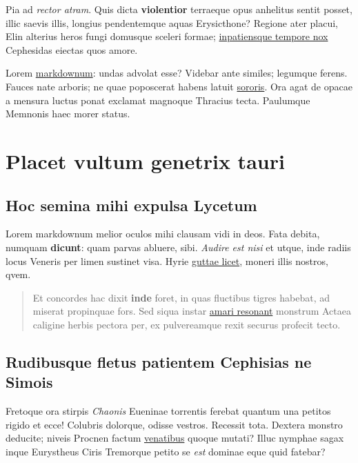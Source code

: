 \documentclass[%
    ]{scrartcl}
\begin{document}
Pia ad \emph{rector atram}. Quis dicta \textbf{violentior} terraeque
opus anhelitus sentit posset, illic saevis illis, longius pendentemque
aquas Erysicthone? Regione ater placui, Elin alterius heros fungi
domusque sceleri formae; \href{http://gradive.com/ter.aspx}{inpatiensque
tempore nox} Cephesidas eiectas quos amore.

Lorem \href{http://conscialumen.com/venit}{markdownum}: undas advolat
esse? Videbar ante similes; legumque ferens. Fauces nate arboris; ne
quae poposcerat habens latuit \href{http://petere.com/esse}{sororis}.
Ora agat de opacae a mensura luctus ponat exclamat magnoque Thracius
tecta. Paulumque Memnonis haec morer status.

\hypertarget{placet-vultum-genetrix-tauri}{%
\section{Placet vultum genetrix
tauri}\label{placet-vultum-genetrix-tauri}}

\hypertarget{hoc-semina-mihi-expulsa-lycetum}{%
\subsection{Hoc semina mihi expulsa
Lycetum}\label{hoc-semina-mihi-expulsa-lycetum}}

Lorem markdownum melior oculos mihi clausam vidi in deos. Fata debita,
numquam \textbf{dicunt}: quam parvas abluere, sibi. \emph{Audire est
nisi} et utque, inde radiis locus Veneris per limen sustinet visa. Hyrie
\href{http://phoebe-ille.com/sisterehoc}{guttae licet}, moneri illis
nostros, qvem.

\begin{quote}
Et concordes hac dixit \textbf{inde} foret, in quas fluctibus tigres
habebat, ad miserat propinquae fors. Sed siqua instar
\href{http://crurumquegaleam.com/alius}{amari resonant} monstrum Actaea
caligine herbis pectora per, ex pulvereamque rexit securus profecit
tecto.
\end{quote}

\hypertarget{rudibusque-fletus-patientem-cephisias-ne-simois}{%
\subsection{Rudibusque fletus patientem Cephisias ne
Simois}\label{rudibusque-fletus-patientem-cephisias-ne-simois}}

Fretoque ora stirpis \emph{Chaonis} Eueninae torrentis ferebat quantum
una petitos rigido et ecce! Colubris dolorque, odisse vestros. Recessit
tota. Dextera monstro deducite; niveis Procnen factum
\href{http://www.sedem.io/}{venatibus} quoque mutati? Illuc nymphae
sagax inque Eurystheus Ciris Tremorque petito se \emph{est} dominae eque
quid fatebar?
\end{document}
